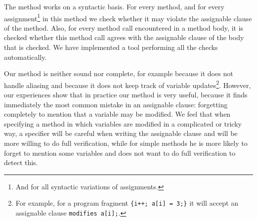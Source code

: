 \documentclass[a4paper]{llncs}
\newcommand{\escj}{\textsc{Esc/Java}}
\newcommand{\jass}{\textsc{Jass}}
\begin{document}
The method works on a syntactic basis. For every method, and for every
assignment\footnote{And for all syntactic variations of assignments.}
in this method we check whether it may violate the assignable clause
of the method. Also, for every method call encountered in a method
body, it is checked whether this method call agrees with the
assignable clause of the body that is checked. We have implemented a
tool performing all the checks automatically.

Our method is neither sound nor complete, for example because it does
not handle aliasing and because it does not keep track of variable
updates\footnote{For example, for a program fragment \texttt{\{i++;
a[i] = 3;\}} it will accept an assignable clause \texttt{modifies
a[i];}.}. However, our experiences show that in practice our method is
very useful, because it finds immediately the most common mistake in
an assignable clause: forgetting completely to mention that a variable
may be modified.  We feel that when specifying a method in which
variables are modified in a complicated or tricky way, a specifier
will be careful when writing the assignable clause and will be more
willing to do full verification, while for simple methods he is more
likely to forget to mention some variables and does not want to
do full verification to detect this.






\end{document}
